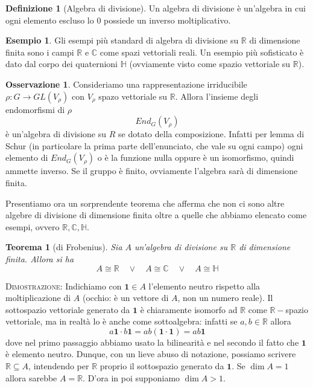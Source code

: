\documentclass[11pt]{article}
\theoremstyle{plain}
\newtheorem{thm}{Teorema}[section]
\theoremstyle{definition}
\newtheorem{defn}{Definizione}[section]
\newtheorem{exmp}{Esempio}[section]
\newtheorem*{rem}{Osservazione}
\theoremstyle{remark}
\newcommand{\C}{\mathbb{C}}
\newcommand{\R}{\mathbb{R}}
\newcommand{\HH}{\mathbb{H}}
\begin{document}
\begin{defn}[Algebra di divisione]
Un algebra di divisione è un'algebra in cui ogni elemento escluso lo $0$ possiede un inverso moltiplicativo.
\end{defn}

\begin{exmp}
Gli esempi più standard di algebra di divisione su $\R$ di dimensione finita sono i campi $\R$ e $\C$ come spazi vettoriali reali.
Un esempio più sofisticato è dato dal corpo dei quaternioni $\HH$ (ovviamente visto come spazio vettoriale su $\R$).
\end{exmp}


\begin{rem}
Consideriamo una rappresentazione irriducibile $\rho:G\to GL(V_\rho)$ con $V_\rho$ spazo vettoriale su $\R$. Allora l'insieme degli endomorfismi
di $\rho$ 
\[ End_G(V_\rho)\]
è un'algebra di divisione su $R$ se dotato della composizione.
Infatti per lemma di Schur (in particolare la prima parte dell'enunciato, che vale su ogni campo) ogni elemento di $End_G(V_\rho)$ o è la funzione nulla oppure è un isomorfismo, quindi ammette inverso.
Se il gruppo è finito, ovviamente l'algebra sarà di dimensione finita. 
\end{rem}


Presentiamo ora un sorprendente teorema che afferma che non ci sono altre algebre di divisione di dimensione finita oltre a quelle che abbiamo elencato come esempi, ovvero $\R, \C, \HH$.
\begin{thm}[di Frobenius]
\label{thm: frobenius}
Sia $A$ un'algebra di divisione su $\R$ di dimensione finita. Allora si ha 
\[A \cong \R \quad \vee \quad  A \cong \C \quad \vee \quad A  \cong \HH \]
\end{thm}

\textsc{Dimostrazione:}
Indichiamo con $\bm{1}\in A$ l'elemento neutro rispetto alla moltiplicazione di $A$ (occhio: è un vettore di $A$, non un numero reale).
Il sottospazio vettoriale generato da $\bm{1}$ è chiaramente isomorfo ad $\R$ come $\R-$spazio vettoriale, ma in
realtà lo è anche come sottoalgebra: infatti se $a,b\in\R$ allora
\[a\bm{1} \cdot b\bm{1} = ab (\bm{1}\cdot \bm{1}) = ab\bm{1} \]
dove nel primo passaggio abbiamo usato la bilinearità e nel secondo il fatto che $\bm{1}$ è elemento neutro.
Dunque, con un lieve abuso di notazione, possiamo scrivere $\R \subseteq A$, intendendo per $\R$ proprio il sottospazio generato da $\bm{1}$.
Se $\dim A = 1$ allora sarebbe $A=\R$. D'ora in poi supponiamo $\dim A > 1$.
\end{document}
